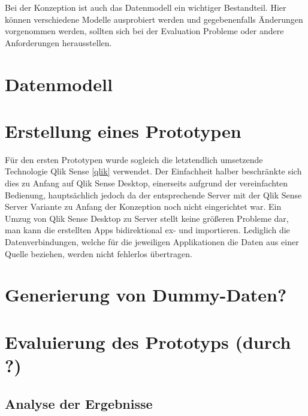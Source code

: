 Bei der Konzeption ist auch das Datenmodell ein wichtiger Bestandteil. 
Hier können verschiedene Modelle ausprobiert werden und gegebenenfalls Änderungen vorgenommen werden, sollten sich bei der Evaluation Probleme oder andere Anforderungen herausstellen.

\section{Datenmodell}

\section{Erstellung eines Prototypen}
Für den ersten Prototypen wurde sogleich die letztendlich umsetzende Technologie Qlik Sense \ref{qlik} verwendet. 
Der Einfachheit halber beschränkte sich dies zu Anfang auf Qlik Sense Desktop, einerseits aufgrund der vereinfachten Bedienung, hauptsächlich jedoch da der entsprechende Server mit der Qlik Sense Server Variante zu Anfang der Konzeption noch nicht eingerichtet war. 
Ein Umzug von Qlik Sense Desktop zu Server stellt keine größeren Probleme dar, man kann die erstellten Apps bidirektional ex- und importieren. 
Lediglich die Datenverbindungen, welche für die jeweiligen Applikationen die Daten aus einer Quelle beziehen, werden nicht fehlerlos übertragen.



\section{Generierung von Dummy-Daten?}

\section{Evaluierung  des Prototyps (durch ?)}
\subsection{Analyse der Ergebnisse}